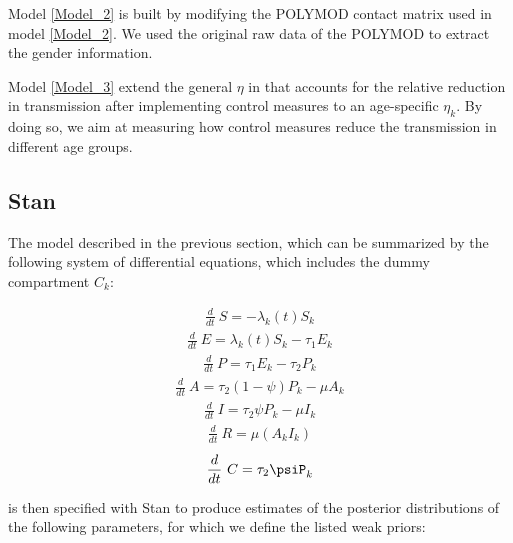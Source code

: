 \documentclass[../main.tex]{subfiles}
\begin{document}
Model \ref{Model_2} is built by modifying the POLYMOD contact matrix used in model \ref{Model_2}. We used the original raw data of the POLYMOD to extract the gender information. %

Model \ref{Model_3} extend the general $\eta$ in \cite{The original work} that accounts for the relative reduction in transmission after implementing control measures to an age-specific  $\eta_k$. By doing so, we aim at measuring how control measures reduce the transmission in different age groups. %



\subsection{Stan}
\label{sec: Stan}

The model described in the previous section, which can be summarized by the following system of differential equations, which includes the dummy compartment $C_{k}$:

\begin{align}
\frac{d}{dt}~S=-\lambda_{k}(t) S_{k} 
\end{align}
\begin{align}
\frac{d}{dt}~E = \lambda_{k}(t) S_{k} - \tau_{1} E_{k}
\end{align}
\begin{align}
\frac{d}{dt}~P = \tau_{1}  E_{k} - \tau_{2}  P_{k}
\end{align}
\begin{align}
\frac{d}{dt}~A = \tau_{2}(1-\psi)  P_{k} - \mu  A_{k}
\end{align}
\begin{align}
\frac{d}{dt}~I = \tau_{2}  \psi  P_{k} - \mu  I_{k}
\end{align}
\begin{align}
\frac{d}{dt}~R = \mu  (A_{k}  I_{k})
\end{align}
\begin{align}
\frac{d}{dt}~C=\tau_{2}\psiP_{k}
\end{align}

is then specified with Stan to produce estimates of the posterior distributions of the following parameters, for which we define the listed weak priors:
\end{document}
